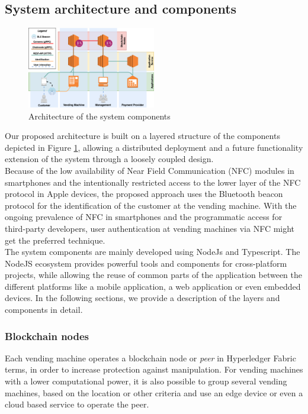 \subsection{System architecture and components}
\begin{figure}[ht]
\centering
  \includegraphics[width=0.5\textwidth]{assets/systemarch.png}
\caption{Architecture of the system components}
\label{fig:systemarch}
\end{figure}
Our proposed architecture is built on a layered structure of the components depicted in Figure \ref{fig:systemarch}, allowing a distributed deployment and a future functionality extension of the system through a loosely coupled design. \\
Because of the low availability of Near Field Communication (NFC) modules in smartphones and the intentionally restricted access to the lower layer of the NFC protocol in Apple devices, the proposed approach uses the Bluetooth beacon protocol for the identification of the customer at the vending machine. With the ongoing prevalence of NFC in smartphones and the programmatic access for third-party developers, user authentication at vending machines via NFC might get the preferred technique.\\
The system components are mainly developed using NodeJs and Typescript. The NodeJS ecosystem provides powerful tools and components for cross-platform projects, while allowing the reuse of common parts of the application between the different platforms like a mobile application, a web application or even embedded devices. In the following sections, we provide a description of the layers and components in detail.

\subsubsection{Blockchain nodes}
Each vending machine operates a blockchain node or \textit{peer} in Hyperledger Fabric terms, in order to increase protection against manipulation. For vending machines with a lower computational power, it is also possible to group several vending machines, based on the location or other criteria and use an edge device or even a cloud based service to operate the peer. 

